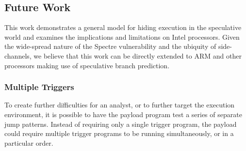 %
%
%


\subsection{Future Work}
\label{subsec:future-work}

This work demonstrates a general model for hiding execution in 
the speculative world and examines the implications and limitations on 
Intel processors. Given the wide-spread nature of the Spectre vulnerability 
and the ubiquity of side-channels, we believe that this work can 
be directly extended to ARM and other processors making use of
speculative branch prediction.

\subsubsection{Multiple Triggers}
To create further difficulties for an analyst, or to further target the
execution environment, it is possible to have the payload program test a series
of separate jump patterns. Instead of requiring only a single trigger program,
the payload could require multiple trigger programs to be running
simultaneously, or in a particular order.

